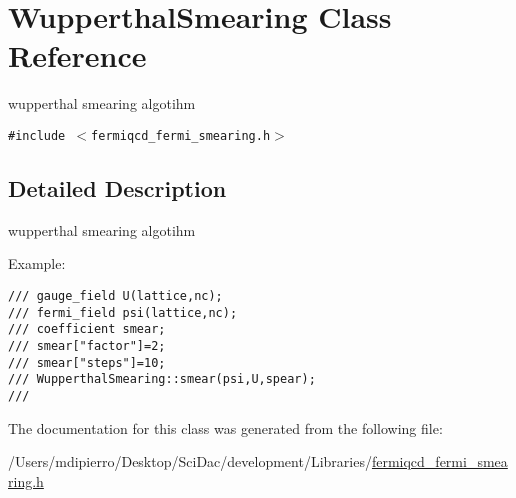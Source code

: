 \hypertarget{class_wupperthal_smearing}{
\section{WupperthalSmearing Class Reference}
\label{class_wupperthal_smearing}
}
wupperthal smearing algotihm  


{\tt \#include $<$fermiqcd\_\-fermi\_\-smearing.h$>$}



\subsection{Detailed Description}
wupperthal smearing algotihm 

Example: 

\footnotesize\begin{verbatim}
/// gauge_field U(lattice,nc);
/// fermi_field psi(lattice,nc);
/// coefficient smear;
/// smear["factor"]=2;
/// smear["steps"]=10;
/// WupperthalSmearing::smear(psi,U,spear);
/// \end{verbatim}
\normalsize
 

The documentation for this class was generated from the following file:\begin{CompactItemize}
\item 
/Users/mdipierro/Desktop/SciDac/development/Libraries/\hyperlink{fermiqcd__fermi__smearing_8h}{fermiqcd\_\-fermi\_\-smearing.h}\end{CompactItemize}

